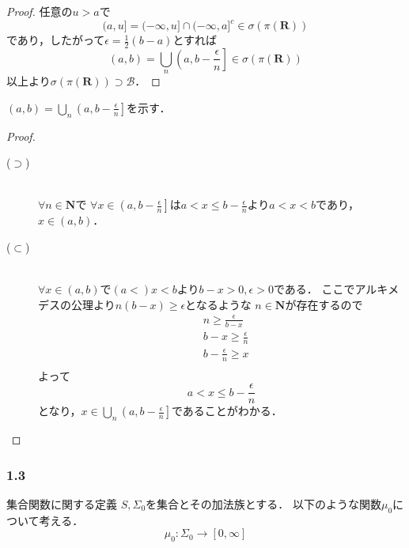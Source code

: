 \documentclass{jsarticle}
\begin{document}
\begin{proof}
    任意の$u>a$で
    \begin{equation}
        (a,u]=(-\infty,u]\cap(-\infty,a]^c \in \sigma(\pi(\mathbf{R})) \nonumber
    \end{equation}
    であり，したがって$\epsilon=\frac{1}{2}(b-a)$とすれば
    \begin{equation}
        (a,b)=\bigcup_n \left( a,b-\frac{\epsilon}{n} \right] \in \sigma(\pi(\mathbf{R})) \nonumber
    \end{equation}
    以上より$\sigma(\pi(\mathbf{R})) \supset \mathcal{B}$．

\end{proof}

\begin{itembox}[l]{}
$(a,b)=\bigcup_n \left( a,b-\frac{\epsilon}{n} \right]$を示す．
    \begin{proof}
    \begin{description}
        \item[($\supset$)]\mbox{}\\
            $\forall n\in\mathbf{N}$で
            $\forall x\in\left( a,b-\frac{\epsilon}{n} \right]$は$a<x\leq b-\frac{\epsilon}{n}$より$a<x<b$であり，$x\in(a,b)$．
        \item[($\subset$)]\mbox{}\\
            $\forall x\in(a,b)$で$(a<)x<b$より$b-x>0,\epsilon>0$である．
            ここでアルキメデスの公理より$n(b-x)\geq\epsilon$となるような $n\in\mathbf{N}$が存在するので
            \begin{align}
               &n\geq\frac{\epsilon}{b-x} \nonumber \\
               &b-x\geq\frac{\epsilon}{n} \nonumber \\
               &b-\frac{\epsilon}{n} \geq x \nonumber \\
            \end{align}
            よって
            \begin{equation}
                a< x \leq b-\frac{\epsilon}{n} \nonumber 
            \end{equation}
            となり，$x\in\bigcup_n \left( a,b-\frac{\epsilon}{n} \right]$であることがわかる．
    \end{description}
    \end{proof}
\end{itembox}


\subsubsection*{1.3}
集合関数に関する定義
$S,\Sigma_0$を集合とその加法族とする．
以下のような関数$\mu_0$について考える．
\begin{equation}
    \mu_0:\Sigma_0\to[0,\infty] \nonumber
\end{equation}
\end{document}
